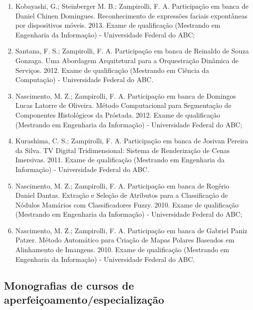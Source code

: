 \begin{enumerate}
    \item Kobayashi, G.; Steinberger M. B.; Zampirolli, F. A. Participação em banca de Daniel Chinen Domingues. Reconhecimento de expressões faciais expontâneas por dispositivos móveis. 2013. Exame de qualificação (Mestrando em Engenharia da Informação) - Universidade Federal do ABC;
    \item Santana, F. S.; Zampirolli, F. A. Participação em banca de Reinaldo de Souza Gonzaga. Uma Abordagem Arquitetural para a Orquestração Dinâmica de Serviços. 2012. Exame de qualificação (Mestrando em Ciência da Computação) - Universidade Federal do ABC.
    \item Nascimento, M. Z.; Zampirolli, F. A. Participação em banca de Domingos Lucas Latorre de Oliveira. Método Computacional para Segmentação de Componentes Histológicos da Próstada. 2012. Exame de qualificação (Mestrando em Engenharia da Informação) - Universidade Federal do ABC;
    \item Kurashima, C. S.; Zampirolli, F. A. Participação em banca de Josivan Pereira da Silva. TV Digital Tridimensional: Sistema de Renderização de Cenas Imersivas. 2011. Exame de qualificação (Mestrando em Engenharia da Informação) - Universidade Federal do ABC.
    \item Nascimento, M. Z.; Zampirolli, F. A. Participação em banca de Rogério Daniel Dantas. Extração e Seleção de Atributos para a Classificação de Nódulos Mamários com Classificadores Fuzzy. 2010. Exame de qualificação (Mestrando em Engenharia da Informação) - Universidade Federal do ABC;
    \item Nascimento, M. Z.; Zampirolli, F. A. Participação em banca de Gabriel Paniz Patzer. Método Automático para Criação de Mapas Polares Baseados em Alinhamento de Imangens. 2010. Exame de qualificação (Mestrando em Engenharia da Informação) - Universidade Federal do ABC.
\end{enumerate}

\subsection{Monografias de cursos de aperfeiçoamento/especialização}

